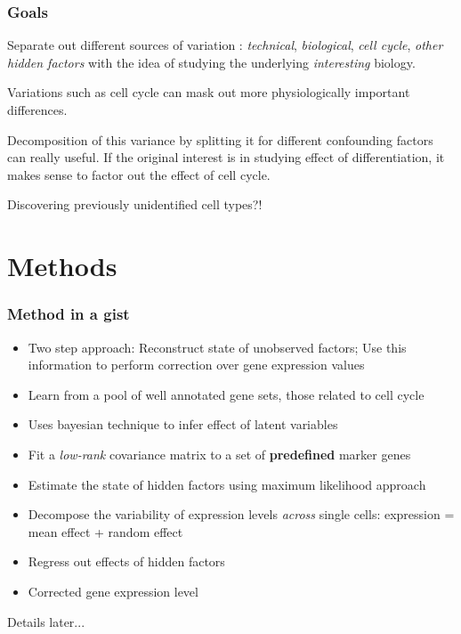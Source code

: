 \documentclass[10pt, compress]{beamer}
\renewcommand{\(}{\begin{columns}}
\renewcommand{\)}{\end{columns}}
\newcommand{\<}[1]{\begin{column}{#1}}
\renewcommand{\>}{\end{column}}
\begin{document}
\begin{frame}[fragile]
\frametitle{Goals}
Separate out different sources of variation : \textit{technical}, \textit{biological}, \textit{cell cycle}, \textit{other hidden factors}
with the idea of studying the underlying \textit{interesting} biology. 

Variations such as cell cycle can mask out more physiologically important differences.

Decomposition of this variance by splitting it for different confounding factors can really useful.
If the original interest is in studying effect of differentiation, it makes sense to factor out the
effect of cell cycle.


Discovering previously unidentified cell types?!

\end{frame}


\section{Methods}
\begin{frame}[fragile]
\frametitle{Method in a gist}
\begin{itemize}
\item Two step approach: Reconstruct state of unobserved factors; Use this information to perform correction over gene 
expression values
\item Learn from a pool of well annotated gene sets, those related to cell cycle
\item Uses bayesian technique to infer effect of latent variables
\item Fit a \textit{low-rank} covariance matrix to a set of \textbf{predefined} marker genes
\item Estimate the state of hidden factors using maximum likelihood approach
\item Decompose the variability of expression levels \textit{across} single cells: expression = mean effect + random effect
\item Regress out effects of hidden factors
\item Corrected gene expression level

\end{itemize}
Details later...
\end{frame}
\end{document}
